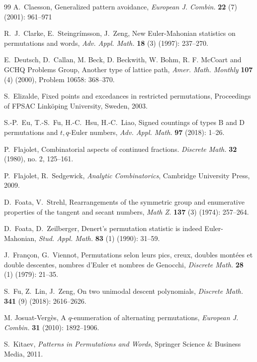 \documentclass[12pt,reqno]{amsart}
\numberwithin{equation}{section}
\theoremstyle{plain}
\theoremstyle{definition}
\begin{document}
\begin{thebibliography}{99}
 A.~Claesson, Generalized pattern avoidance, \textit{European J. Combin.} {\bf 22} (7) (2001): 961--971

 R.~J.~Clarke, E.~Steingr\'{i}msson, J.~Zeng, New Euler-Mahonian statistics on permutations and words, \textit{Adv. Appl. Math.} {\bf 18} (3) (1997): 237--270.

 E.~Deutsch, D.~Callan, M. Beck, D. Beckwith, W. Bohm, R. F. McCoart and GCHQ Problems Group, Another type of lattice path, \textit{Amer. Math. Monthly} {\bf 107} (4) (2000), Problem 10658: 368--370.

 S.~Elizalde, Fixed points and excedances in restricted permutations, Proceedings of FPSAC Link\"oping University, Sweden, 2003.



 S.-P.~Eu, T.-S.~Fu, H.-C.~Hsu, H.-C.~Liao, Signed countings of types B and D permutations and $t,q$-Euler numbers, \textit{Adv. Appl. Math.} {\bf 97} (2018): 1--26.




 P.~Flajolet, Combinatorial aspects of continued fractions. \textit{Discrete Math.} {\bf 32} (1980), no. 2, 125--161.

 P.~Flajolet, R.~Sedgewick, \textit{Analytic Combinatorics}, Cambridge University Press, 2009.





 D.~Foata, V.~Strehl, Rearrangements of the symmetric group and enumerative properties of the tangent and secant numbers, \textit{Math Z.} {\bf137} (3) (1974): 257--264.

 D.~Foata, D.~Zeilberger, Denert's permutation statistic is indeed Euler-Mahonian, \textit{Stud. Appl. Math.} {\bf83} (1) (1990): 31--59.

 J.~Fran\c con, G.~Viennot, Permutations selon leurs pics, creux, doubles mont\'ees et double descentes, nombres d'Euler et nombres de Genocchi, \textit{Discrete Math.} {\bf28} (1) (1979): 21--35.

 S.~Fu, Z.~Lin, J.~Zeng, On two unimodal descent polynomials, \textit{Discrete Math.} {\bf 341} (9) (2018): 2616--2626.



 M. Josuat-Verg\`{e}s, A $q$-enumeration of alternating permutations, \textit{European J. Combin.} {\bf 31} (2010): 1892--1906.

 S.~Kitaev, \textit{Patterns in Permutations and Words}, Springer Science $\&$ Business Media, 2011.


\end{thebibliography}
\end{document}
